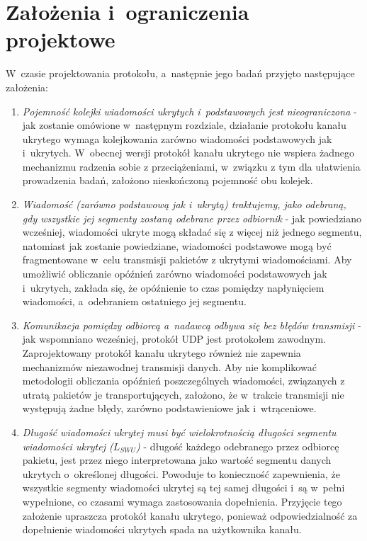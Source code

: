 \documentclass[a4paper, twoside, 12pt]{report}
\begin{document}
    \section{Założenia i~ograniczenia projektowe}
    W~czasie projektowania protokołu, a~następnie jego badań przyjęto następujące założenia:
    \begin{enumerate}
        \item \emph{Pojemność kolejki wiadomości ukrytych i~podstawowych jest nieograniczona} -
            jak zostanie omówione w~następnym rozdziale, działanie protokołu
            kanału ukrytego wymaga kolejkowania zarówno wiadomości podstawowych
            jak i~ukrytych. W~obecnej wersji protokół kanału ukrytego nie wspiera
            żadnego mechanizmu radzenia sobie z przeciążeniami, w~związku z tym
            dla ułatwienia prowadzenia badań, założono nieskończoną pojemność obu kolejek.

        \item \emph{Wiadomość (zarówno podstawową jak i~ukrytą) traktujemy, jako odebraną,
            gdy wszystkie jej segmenty zostaną odebrane przez odbiornik} - jak powiedziano
            wcześniej, wiadomości ukryte mogą składać się z więcej niż jednego segmentu,
            natomiast jak zostanie powiedziane, wiadomości podstawowe mogą być fragmentowane
            w~celu transmisji pakietów z ukrytymi wiadomościami. Aby umożliwić
            obliczanie opóźnień zarówno wiadomości podstawowych jak i~ukrytych,
            zakłada się, że opóźnienie to czas pomiędzy napłynięciem wiadomości,
            a~odebraniem ostatniego jej segmentu.

        \item \emph{Komunikacja pomiędzy odbiorcą a~nadawcą odbywa się bez błędów transmisji} -
            jak wspomniano wcześniej, protokół UDP jest protokołem zawodnym.
            Zaprojektowany protokół kanału ukrytego również nie zapewnia mechanizmów niezawodnej
            transmisji danych. Aby nie komplikować metodologii
            obliczania opóźnień poszczególnych wiadomości, związanych z utratą
            pakietów je transportujących, założono, że w~trakcie transmisji nie
            występują żadne błędy, zarówno podstawieniowe jak i~wtrąceniowe.

        \item \emph{Długość wiadomości ukrytej musi być wielokrotnością długości segmentu
            wiadomości ukrytej (\(L_{SWU}\))} - długość każdego odebranego przez odbiorcę pakietu,
            jest przez niego interpretowana jako wartość segmentu danych ukrytych o~określonej
            długości. Powoduje to konieczność zapewnienia, że wszystkie segmenty
            wiadomości ukrytej są tej samej długości i~są w~pełni wypełnione, co czasami
            wymaga zastosowania dopełnienia. Przyjęcie tego założenie upraszcza protokół
            kanału ukrytego, ponieważ odpowiedzialność za dopełnienie wiadomości ukrytych
            spada na użytkownika kanału.
    \end{enumerate}
\end{document}
